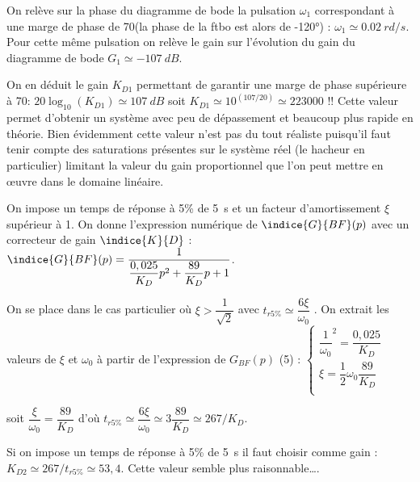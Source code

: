 \ifprof
\begin{corrige}%
On relève sur la phase du diagramme de bode la pulsation $\omega_1$ correspondant à une marge de phase de 70\degres (la phase de la ftbo est alors de -120°) : $\omega_1\simeq \SI{0.02}{rd/s}$. Pour cette même pulsation on relève le gain sur l’évolution du gain du diagramme de bode $G_1 \simeq -\SI{107}{dB}$.

On en déduit le gain $K_{D1}$ permettant de garantir une marge de phase supérieure à 70\degres :
$20\log_10 (K_{D1})\simeq \SI{107}{dB}$ soit $K_{D1}\simeq 10^(107/20)\simeq 223000$ !!
Cette valeur permet d’obtenir un système avec peu de dépassement et beaucoup plus rapide en théorie. Bien évidemment cette valeur n’est pas du tout réaliste puisqu’il faut tenir compte des saturations présentes sur le système réel (le hacheur en particulier) limitant la valeur du gain proportionnel que l’on peut mettre en œuvre dans le domaine linéaire.

\end{corrige}
\else
\fi


 On impose un temps de réponse à 5\% de \SI{5}{s} et un facteur d’amortissement $\xi$ supérieur à 1.
 On donne l’expression numérique de $\indice{G}{BF}(p)$ avec un correcteur de gain $\indice{K}{D}$ :
 $\indice{G}{BF}(p)=\dfrac{1}{\dfrac{0,025}{K_D}p^2+\dfrac{89}{K_D}p +1}$.
 
 
\ifprof
\begin{corrige}%
On se place dans le cas particulier où $\xi>\dfrac{1}{\sqrt{2}}$ avec $t_{r5\%}\simeq \dfrac{6 \xi}{\omega_0}$ . On extrait les valeurs de $\xi$ et $\omega_0$ à partir de l’expression de $G_{BF}(p)$ (5) :
$\left\{
\begin{array}{l}
\dfrac{1}{\omega_0 }^2=\dfrac{0,025}{K_D} \\
\xi =\dfrac{1}{2}\omega_0 \dfrac{89}{K_D}   \\
\end{array}
\right.
$

soit $\dfrac{\xi}{\omega_0} =\dfrac{89}{K_D}$  d’où $t_{r5\%}\simeq \dfrac{6\xi}{\omega_0} \simeq 3 \dfrac{89}{K_D}\simeq 267/K_D$.
  
Si on impose un temps de réponse à 5\% de \SI{5}{s} il faut choisir comme gain : $K_{D2}\simeq 267/t_{r5\%} \simeq 53,4$.
Cette valeur semble plus raisonnable….

\end{corrige}
\else
\fi

